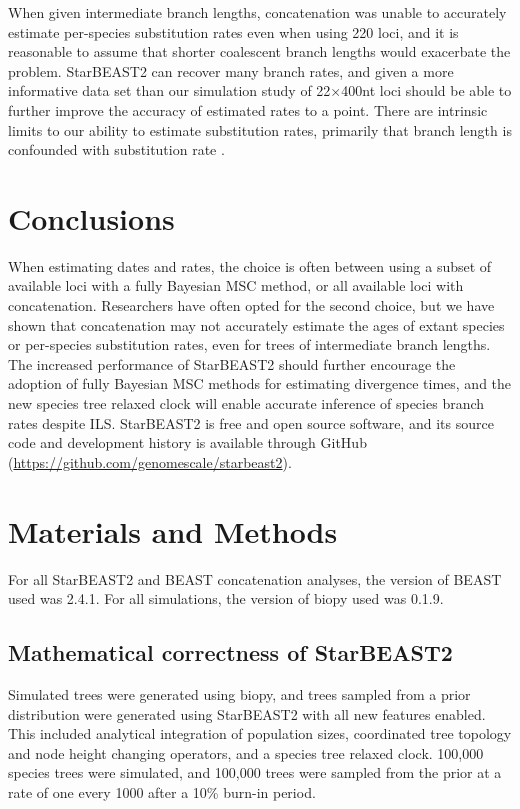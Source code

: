 \documentclass[nogrid]{MBE}%
\begin{document}
When given intermediate branch lengths, concatenation was unable to accurately
estimate per-species substitution rates even when using 220 loci, and it is
reasonable to assume that shorter coalescent branch lengths would
exacerbate the problem. StarBEAST2 can recover many branch rates, and given a
more informative data set than our simulation study of 22$\times$400nt loci
should be able to further improve the accuracy of estimated rates to a point.
There are intrinsic limits to our ability to estimate substitution rates,
primarily that branch length is confounded with substitution rate
\citep{Thorne01092002}.

\section{Conclusions}

When estimating dates and rates, the choice is often between using a subset of
available loci with a fully Bayesian MSC method, or all available loci with
concatenation. Researchers have often opted for the second choice, but we have
shown that concatenation may not accurately estimate the ages of extant species
or per-species substitution rates, even for trees of intermediate branch lengths. The
increased performance of StarBEAST2 should further encourage the adoption of
fully Bayesian MSC methods for estimating divergence times, and the new species
tree relaxed clock will enable accurate inference of species branch rates despite
ILS. StarBEAST2 is free and open source software, and its source code and
development history is available through GitHub
(\url{https://github.com/genomescale/starbeast2}).

\section{Materials and Methods}

For all StarBEAST2 and BEAST concatenation analyses, the version of BEAST used was
2.4.1. For all simulations, the version of biopy \citep{biopy} used was 0.1.9.

\subsection{Mathematical correctness of StarBEAST2}

Simulated trees were generated using biopy, and trees sampled from a prior
distribution were generated using StarBEAST2 with all new features enabled. This
included analytical integration of population sizes, coordinated tree topology
and node height changing operators, and a species tree relaxed clock. 100,000
species trees were simulated, and 100,000 trees were sampled from the prior at a
rate of one every 1000 after a 10\% burn-in period.
\end{document}
